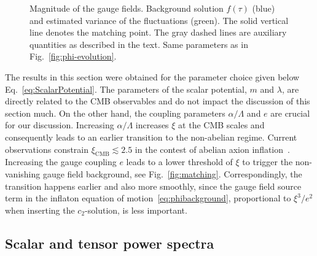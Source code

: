 \begin{figure}[t]
\hfill
{}
\caption{Magnitude of the gauge fields. Background solution $f(\tau)$ (blue) and estimated variance of the fluctuations (green). The solid vertical line denotes the matching point. The gray dashed lines are auxiliary quantities as described in the text. Same parameters as in Fig.~\ref{fig:phi-evolution}.}
 \label{fig:variance}
\end{figure}

The results in this section were obtained for the parameter choice given below Eq.~\eqref{eq:ScalarPotential}. The parameters of the scalar potential, $m$ and $\lambda$, are directly related to the CMB observables and do not impact the discussion of this section much. On the other hand, the coupling parameters $\alpha/\Lambda$ and $e$ are crucial for our discussion. Increasing $\alpha/\Lambda$ increases $\xi$ at the CMB scales and consequently leads to an earlier transition to the non-abelian regime. Current observations constrain $\xi_\text{CMB} \lesssim 2.5$ in the contest of abelian axion inflation~\cite{Barnaby:2011qe}. Increasing the gauge coupling $e$ leads to a lower threshold of $\xi$ to trigger the non-vanishing gauge field background, see Fig.~\ref{fig:matching}. Correspondingly, the transition happens earlier and also more smoothly, since the gauge field source term in the inflaton equation of motion~\eqref{eq:phibackground}, proportional to $\xi^3/e^2$ when inserting the $c_2$-solution, is less important.

 

 
\subsection{Scalar and tensor power spectra \label{subsec:powerspectra}}

